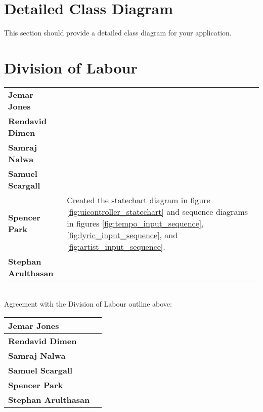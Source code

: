 \documentclass[]{article}
\begin{document}
\section{Detailed Class Diagram}
\label{sec:detailed_class_diagram}
This section should provide a detailed class diagram for your application.

\appendix
\newpage
\section{Division of Labour}
\label{sec:division_of_labour}
\noindent\begin{tabular}{l l}
	\textbf{Jemar Jones} & \\
	\textbf{Rendavid Dimen} & \\
	\textbf{Samraj Nalwa} & \\
	\textbf{Samuel Scargall} & \\
	\textbf{Spencer Park} & Created the statechart diagram in figure \ref{fig:uicontroller_statechart} and sequence diagrams in figures \ref{fig:tempo_input_sequence}, \ref{fig:lyric_input_sequence}, and \ref{fig:artist_input_sequence}.\\
	\textbf{Stephan Arulthasan} & \\
\end{tabular}
\\

\noindent Agreement with the Division of Labour outline above:

\noindent\begin{tabularx}{\linewidth}{|l|X|}
	\hline
	\rule{0pt}{2em} \textbf{Jemar Jones} & \\
	\hline
	\rule{0pt}{2em} \textbf{Rendavid Dimen} & \\
	\hline
	\rule{0pt}{2em} \textbf{Samraj Nalwa} & \\
	\hline
	\rule{0pt}{2em} \textbf{Samuel Scargall} & \\
	\hline
	\rule{0pt}{2em} \textbf{Spencer Park} & \\
	\hline
	\rule{0pt}{2em} \textbf{Stephan Arulthasan} & \\
	\hline
\end{tabularx}

\newpage
\end{document}

